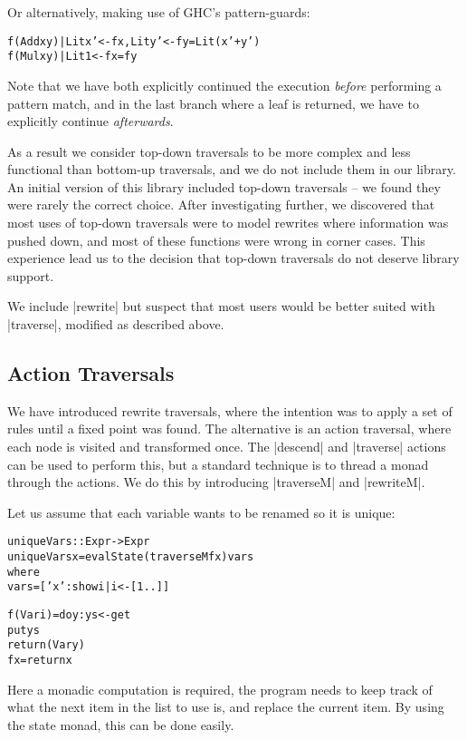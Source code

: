 \documentclass[preprint]{sigplanconf}
\newenvironment{code}{\begin{alltt}\small}{\end{alltt}}
\begin{document}
\noindent Or alternatively, making use of GHC's pattern-guards:

\begin{code}
f (Add  x y) | Lit x'  <- f x, Lit y' <- f y = Lit (x'+y')
f (Mul  x y) | Lit 1   <- f x = f y
\end{code}

Note that we have both explicitly continued the execution \textit{before} performing a pattern match, and in the last branch where a leaf is returned, we have to explicitly continue \textit{afterwards}.

As a result we consider top-down traversals to be more complex and less functional than bottom-up traversals, and we do not include them in our library. An initial version of this library included top-down traversals -- we found they were rarely the correct choice. After investigating further, we discovered that most uses of top-down traversals were to model rewrites where information was pushed down, and most of these functions were wrong in corner cases. This experience lead us to the decision that top-down traversals do not deserve library support.

We include |rewrite| but suspect that most users would be better suited with |traverse|, modified as described above.

\subsection{Action Traversals}

We have introduced rewrite traversals, where the intention was to apply a set of rules until a fixed point was found. The alternative is an action traversal, where each node is visited and transformed once. The |descend| and |traverse| actions can be used to perform this, but a standard technique is to thread a monad through the actions. We do this by introducing |traverseM| and |rewriteM|.

Let us assume that each variable wants to be renamed so it is unique:

\begin{code}
uniqueVars :: Expr -> Expr
uniqueVars x = evalState (traverseM f x) vars
    where
        vars = ['x':show i | i <- [1..]]

        f (Var i)  = do  y:ys <- get
                         put ys
                         return (Var y)
        f x        = return x
\end{code}

Here a monadic computation is required, the program needs to keep track of what the next item in the list to use is, and replace the current item. By using the state monad, this can be done easily.
\end{document}

